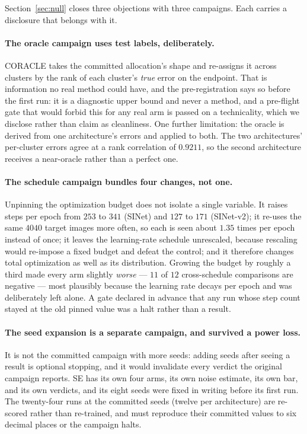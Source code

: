 \documentclass{article}
\begin{document}
Section~\ref{sec:null} closes three objections with three campaigns. Each carries a disclosure that
belongs with it.

\paragraph{The oracle campaign uses test labels, deliberately.} CORACLE takes the committed
allocation's shape and re-assigns it across clusters by the rank of each cluster's \emph{true} error
on the endpoint. That is information no real method could have, and the pre-registration says so
before the first run: it is a diagnostic upper bound and never a method, and a pre-flight gate that
would forbid this for any real arm is passed on a technicality, which we disclose rather than claim
as cleanliness. One further limitation: the oracle is derived from one architecture's errors and
applied to both. The two architectures' per-cluster errors agree at a rank correlation of $0.9211$,
so the second architecture receives a near-oracle rather than a perfect one.

\paragraph{The schedule campaign bundles four changes, not one.} Unpinning the optimization budget
does not isolate a single variable. It raises steps per epoch from $253$ to $341$ (SINet) and $127$
to $171$ (SINet-v2); it re-uses the same $4040$ target images more often, so each is seen about
$1.35$ times per epoch instead of once; it leaves the learning-rate schedule unrescaled, because
rescaling would re-impose a fixed budget and defeat the control; and it therefore changes total
optimization as well as its distribution. Growing the budget by roughly a third made every arm
slightly \emph{worse} --- $11$ of $12$ cross-schedule comparisons are negative --- most plausibly
because the learning rate decays per epoch and was deliberately left alone. A gate declared in
advance that any run whose step count stayed at the old pinned value was a halt rather than a
result.

\paragraph{The seed expansion is a separate campaign, and survived a power loss.} It is not the
committed campaign with more seeds: adding seeds after seeing a result is optional stopping, and it
would invalidate every verdict the original campaign reports. SE has its own four arms, its own
noise estimate, its own bar, and its own verdicts, and its eight seeds were fixed in writing before
its first run. The twenty-four runs at the committed seeds (twelve per architecture) are re-scored rather than re-trained, and must
reproduce their committed values to six decimal places or the campaign halts.
\end{document}
